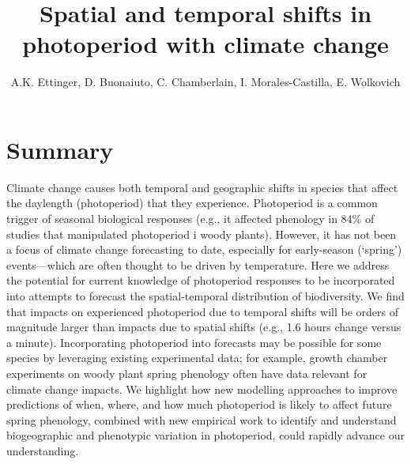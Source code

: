 \documentclass{article}
\begin{document}
 
\title{Spatial and temporal shifts in photoperiod with climate change} %

\author{A.K. Ettinger, D. Buonaiuto, C. Chamberlain, I. Morales-Castilla, E. Wolkovich}
\maketitle  %


\section*{Summary}
Climate change causes both temporal and geographic shifts in species that affect the daylength (photoperiod) that they experience. Photoperiod is a common trigger of seasonal biological responses (e.g., it affected phenology in 84\% of studies that manipulated photoperiod i woody plants). However, it has not been a focus of climate change forecasting to date, especially for early-season (`spring') events---which are often thought to be driven by temperature. Here we address the potential for current knowledge of photoperiod responses to be incorporated into attempts to forecast the spatial-temporal distribution of biodiversity. We find that impacts on experienced photoperiod due to temporal shifts will be orders of magnitude larger than impacts due to spatial shifts (e.g., 1.6 hours change versus a minute). Incorporating photoperiod into forecasts may be possible for some species by leveraging existing experimental data; for example, growth chamber experiments on woody plant spring phenology often have data relevant for climate change impacts. We highlight how new modelling approaches to improve predictions of when, where, and how much photoperiod is likely to affect future spring phenology, combined with new empirical work to identify and understand biogeographic and phenotypic variation in photoperiod, could rapidly advance our understanding. %
\end{document}
